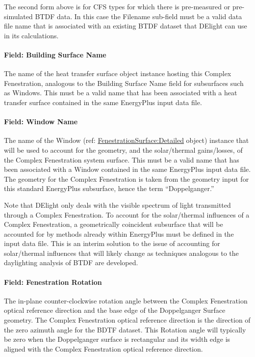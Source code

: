 The second form above is for CFS types for which there is pre-measured or pre-simulated BTDF data. In this case the Filename sub-field must be a valid data file name that is associated with an existing BTDF dataset that DElight can use in its calculations.

\paragraph{Field: Building Surface Name}\label{field-building-surface-name}

The name of the heat transfer surface object instance hosting this Complex Fenestration, analogous to the Building Surface Name field for subsurfaces such as Windows. This must be a valid name that has been associated with a heat transfer surface contained in the same EnergyPlus input data file.

\paragraph{Field: Window Name}\label{field-window-name}

The name of the Window (ref: \hyperref[fenestrationsurfacedetailed]{FenestrationSurface:Detailed} object) instance that will be used to account for the geometry, and the solar/thermal gains/losses, of the Complex Fenestration system surface. This must be a valid name that has been associated with a Window contained in the same EnergyPlus input data file. The geometry for the Complex Fenestration is taken from the geometry input for this standard EnergyPlus subsurface, hence the term ``Doppelganger.''

Note that DElight only deals with the visible spectrum of light transmitted through a Complex Fenestration. To account for the solar/thermal influences of a Complex Fenestration, a geometrically coincident subsurface that will be accounted for by methods already within EnergyPlus must be defined in the input data file. This is an interim solution to the issue of accounting for solar/thermal influences that will likely change as techniques analogous to the daylighting analysis of BTDF are developed.

\paragraph{Field: Fenestration Rotation}\label{field-fenestration-rotation}

The in-plane counter-clockwise rotation angle between the Complex Fenestration optical reference direction and the base edge of the Doppelganger Surface geometry. The Complex Fenestration optical reference direction is the direction of the zero azimuth angle for the BDTF dataset. This Rotation angle will typically be zero when the Doppelganger surface is rectangular and its width edge is aligned with the Complex Fenestration optical reference direction.

